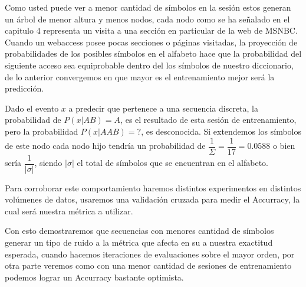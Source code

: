 Como usted puede ver a menor cantidad de símbolos en la sesión estos generan un árbol de menor altura y menos nodos, cada nodo como se ha señalado en el capitulo 4 representa un visita a una sección en particular de la web de MSNBC. Cuando un webaccess posee  pocas secciones o páginas visitadas, la proyección de probabilidades de los posibles símbolos en el alfabeto hace que la probabilidad del siguiente acceso sea equiprobable dentro del los símbolos de nuestro diccionario, de lo anterior convergemos en que mayor es el entrenamiento mejor será la predicción.

Dado el evento $x$  a predecir que pertenece a una secuencia discreta, la probabilidad de $P( x| AB  ) = A $, es el resultado de esta sesión de entrenamiento, pero la probabilidad $P(x | AAB) = ?$, es desconocida.  Si extendemos los símbolos de este nodo cada nodo hijo tendría un probabilidad de $ \dfrac{1}{\Sigma} = \dfrac{1}{17} = 0.0588 $ o bien sería  $\dfrac{1}{ |\sigma| }$, siendo $|\sigma|$ el total de símbolos que se encuentran en el alfabeto. 

Para corroborar este comportamiento haremos distintos experimentos en distintos volúmenes de datos, usaremos una validación cruzada para medir el Accurracy, la cual será nuestra métrica a utilizar.

Con esto demostraremos que secuencias con menores cantidad de símbolos generar un tipo de ruido a la métrica  que afecta en su a nuestra exactitud esperada, cuando hacemos iteraciones de evaluaciones sobre el mayor orden, por otra parte veremos como con una menor cantidad de sesiones de entrenamiento podemos lograr un Accurracy bastante optimista.



